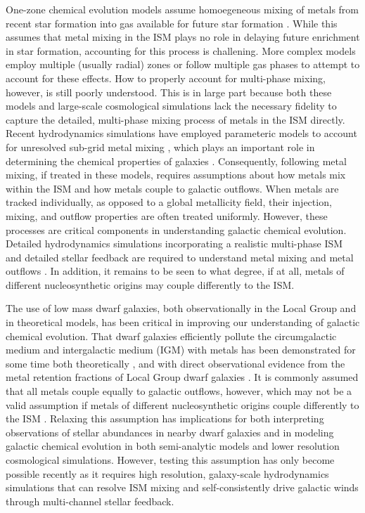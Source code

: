\documentclass[twocolumn]{aastex61}
\begin{document}
One-zone chemical evolution models assume homoegeneous mixing of metals from recent star formation into gas available for future star formation \citep[e.g.][]{Lanfranchi2006b,Kirby2011-III,Cote2017,Andrews2017}. While this assumes that metal mixing in the ISM plays no role in delaying future enrichment in star formation, accounting for this process is challening. More complex models \citep[e.g.][]{SchonrichBinney2009,Pezzulli2016} employ multiple (usually radial) zones or follow multiple gas phases to attempt to account for these effects. How to properly account for multi-phase mixing, however, is still poorly understood. This is in large part because both these models and large-scale cosmological simulations lack the necessary fidelity to capture the detailed, multi-phase mixing process of metals in the ISM directly. Recent hydrodynamics simulations have employed parameteric models to account for unresolved sub-grid metal mixing \citep{PanScannapiecoScalo2013,Sarmento2017}, which plays an important role in determining the chemical properties of galaxies \citep[e.g.][]{Shen2010, Pilkington2012, Few2012, Brook2014, Escala2018}. Consequently, following metal mixing, if treated in these models, requires assumptions about how metals mix within the ISM and how metals couple to galactic outflows. When metals are tracked individually, as opposed to a global metallicity field, their injection, mixing, and outflow properties are often treated uniformly. However, these processes are critical components in understanding galactic chemical evolution. Detailed hydrodynamics simulations incorporating a realistic multi-phase ISM and detailed stellar feedback are required to understand metal mixing and metal outflows \citep[e.g.][]{FengKrumholz2014,Armillotta2018}. In addition, it remains to be seen to what degree, if at all, metals of different nucleosynthetic origins may couple differently to the ISM.

The use of low mass dwarf galaxies, both observationally in the Local Group and in theoretical models, has been critical in improving our understanding of galactic chemical evolution. That dwarf galaxies efficiently pollute the circumgalactic medium and intergalactic medium (IGM) with metals has been demonstrated for some time both theoretically \citep[e.g.][]{DekelSilk1986,MacLowFerrara1999,Fragile2004}, and with direct observational evidence from the metal retention fractions of Local Group dwarf galaxies \citep[e.g.][]{Kirby2011-metals,McQuinn2015}. It is commonly assumed that all metals couple equally to galactic outflows, however, which may not be a valid assumption if metals of different nucleosynthetic origins couple differently to the ISM \citep{KrumholzTing2018}. Relaxing this assumption has implications for both interpreting observations of stellar abundances in nearby dwarf galaxies and in modeling galactic chemical evolution in both semi-analytic models and lower resolution cosmological simulations. However, testing this assumption has only become possible recently as it requires high resolution, galaxy-scale hydrodynamics simulations that can resolve ISM mixing and self-consistently drive galactic winds through multi-channel stellar feedback.
\end{document}
